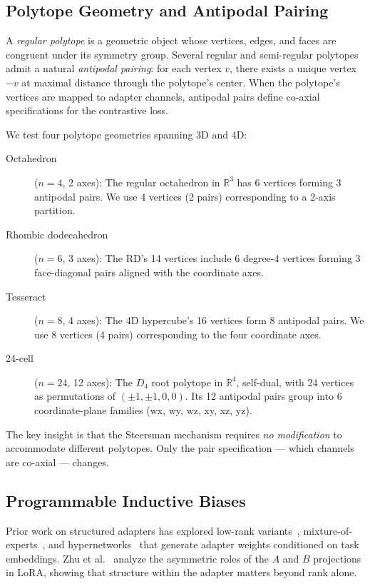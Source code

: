 \subsection{Polytope Geometry and Antipodal Pairing}

A \emph{regular polytope} is a geometric object whose vertices, edges, and
faces are congruent under its symmetry group. Several regular and semi-regular
polytopes admit a natural \emph{antipodal pairing}: for each vertex $v$,
there exists a unique vertex $-v$ at maximal distance through the polytope's
center. When the polytope's vertices are mapped to adapter channels, antipodal
pairs define co-axial specifications for the contrastive loss.

We test four polytope geometries spanning 3D and 4D:

\begin{description}
  \item[Octahedron] ($n{=}4$, 2 axes): The regular octahedron in
    $\mathbb{R}^3$ has 6 vertices forming 3 antipodal pairs. We use 4
    vertices (2 pairs) corresponding to a 2-axis partition.
  \item[Rhombic dodecahedron] ($n{=}6$, 3 axes): The RD's 14 vertices
    include 6 degree-4 vertices forming 3 face-diagonal pairs aligned with
    the coordinate axes.
  \item[Tesseract] ($n{=}8$, 4 axes): The 4D hypercube's 16 vertices form
    8 antipodal pairs. We use 8 vertices (4 pairs) corresponding to the four
    coordinate axes.
  \item[24-cell] ($n{=}24$, 12 axes): The $D_4$ root polytope in
    $\mathbb{R}^4$, self-dual, with 24 vertices as permutations of
    $(\pm 1, \pm 1, 0, 0)$. Its 12 antipodal pairs group into 6
    coordinate-plane families (wx, wy, wz, xy, xz, yz).
\end{description}

The key insight is that the Steersman mechanism requires \emph{no
modification} to accommodate different polytopes. Only the pair specification
--- which channels are co-axial --- changes.

\subsection{Programmable Inductive Biases}

Prior work on structured adapters has explored low-rank
variants~\cite{valipour2023dylora,loraxs2024},
mixture-of-experts~\cite{zadouri2023pushing},
and hypernetworks~\cite{ha2017hypernetworks} that generate adapter weights
conditioned on task embeddings. Zhu et al.~\cite{zhu2024asymmetry} analyze
the asymmetric roles of the $A$ and $B$ projections in LoRA, showing that
structure within the adapter matters beyond rank alone.

